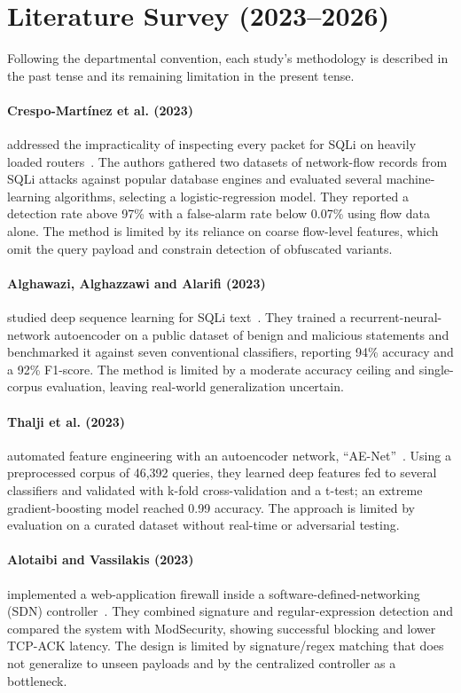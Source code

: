 \documentclass[pdflatex,sn-mathphys-num]{sn-jnl}
\begin{document}
\section{Literature Survey (2023--2026)}\label{sec:survey}

Following the departmental convention, each study's methodology is described in the
past tense and its remaining limitation in the present tense.

\paragraph{Crespo-Mart\'inez et al. (2023)}
addressed the impracticality of inspecting every packet for SQLi on
heavily loaded routers~\cite{crespo2023sqli}. The authors gathered two datasets of
network-flow records from SQLi attacks against popular database engines and
evaluated several machine-learning algorithms, selecting a logistic-regression
model. They reported a detection rate above 97\% with a false-alarm rate below
0.07\% using flow data alone. The method is limited by its reliance on coarse
flow-level features, which omit the query payload and constrain detection of
obfuscated variants.

\paragraph{Alghawazi, Alghazzawi and Alarifi (2023)}
studied deep sequence learning for SQLi text~\cite{alghawazi2023rnn}. They trained a
recurrent-neural-network autoencoder on a public dataset of benign and malicious
statements and benchmarked it against seven conventional classifiers, reporting 94\%
accuracy and a 92\% F1-score. The method is limited by a moderate accuracy ceiling
and single-corpus evaluation, leaving real-world generalization uncertain.

\paragraph{Thalji et al. (2023)}
automated feature engineering with an autoencoder network,
``AE-Net''~\cite{thalji2023aenet}. Using a preprocessed corpus of 46{,}392 queries,
they learned deep features fed to several classifiers and validated with k-fold
cross-validation and a t-test; an extreme gradient-boosting model reached 0.99
accuracy. The approach is limited by evaluation on a curated dataset without
real-time or adversarial testing.

\paragraph{Alotaibi and Vassilakis (2023)}
implemented a web-application firewall inside a software-defined-networking (SDN)
controller~\cite{alotaibi2023sdnwaf}. They combined signature and regular-expression
detection and compared the system with ModSecurity, showing successful blocking and
lower TCP-ACK latency. The design is limited by signature/regex matching that does
not generalize to unseen payloads and by the centralized controller as a bottleneck.
\end{document}

